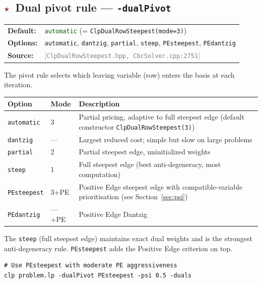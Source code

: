 \documentclass[11pt,a4paper]{article}
\newcommand{\param}[1]{\texttt{\textbf{#1}}}
\newcommand{\val}[1]{\texttt{#1}}
\newcommand{\src}[1]{\textcolor{gray}{\small[\texttt{#1}]}}
\newcommand{\default}[1]{\textcolor{darkgreen}{\texttt{#1}}}
\newcommand{\important}{\textcolor{darkred}{\textbf{$\star$}}}
\begin{document}
\subsection{\important\ Dual pivot rule --- \param{-dualPivot}}

\begin{tabular}{@{}ll@{}}
  \textbf{Default:} & \default{automatic} (= \texttt{ClpDualRowSteepest(mode=3)}) \\
  \textbf{Options:} & \val{automatic}, \val{dantzig}, \val{partial}, \val{steep},
                      \val{PEsteepest}, \val{PEdantzig} \\
  \textbf{Source:}  & \src{ClpDualRowSteepest.hpp, CbcSolver.cpp:2751}
\end{tabular}

\medskip
The pivot rule selects which leaving variable (row) enters the basis at each iteration.

\begin{center}
\begin{tabular}{@{}P{2.5cm}P{1.5cm}P{7.5cm}@{}}
  \toprule
  \textbf{Option} & \textbf{Mode} & \textbf{Description} \\
  \midrule
  \val{automatic} & 3 & Partial pricing, adaptive to full steepest edge
                        (default constructor \texttt{ClpDualRowSteepest(3)}) \\
  \val{dantzig}   & — & Largest reduced cost; simple but slow on large problems \\
  \val{partial}   & 2 & Partial steepest edge, uninitialized weights \\
  \val{steep}     & 1 & Full steepest edge (best anti-degeneracy, most computation) \\
  \val{PEsteepest}& 3+PE & Positive Edge steepest edge with compatible-variable
                            prioritisation (see Section~\ref{sec:psi}) \\
  \val{PEdantzig} & —+PE & Positive Edge Dantzig \\
  \bottomrule
\end{tabular}
\end{center}

\medskip
The \val{steep} (full steepest edge) maintains exact dual weights and is the strongest
anti-degeneracy rule. \val{PEsteepest} adds the Positive Edge criterion on top.

\begin{lstlisting}
# Use PEsteepest with moderate PE aggressiveness
clp problem.lp -dualPivot PEsteepest -psi 0.5 -duals
\end{lstlisting}
\end{document}
